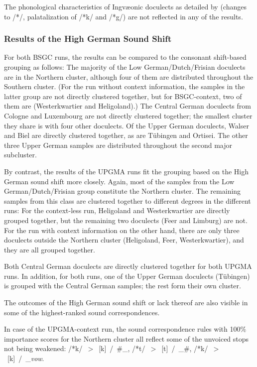 \documentclass[a4paper]{article}
\begin{document}
The phonological characteristics of Ingv\ae{}onic doculects
as detailed by \citet{stiles2013pan-west}
(changes to /*\textscripta{}/, palatalization of /*k/ and /*g/)
are not reflected in any of the results.

\subsubsection{Results of the High German Sound Shift}

For both BSGC runs, the results can be compared to the consonant shift-based grouping as follows:
The majority of the Low German/Dutch/Frisian doculects are in
the Northern cluster,
although four of them are distributed throughout the Southern cluster.
(For the run without context information,
the samples in the latter group are not directly clustered together,
but for BSGC-context,
two of them are (Westerkwartier and Heligoland).)
The Central German doculects from Cologne and Luxembourg
are not directly clustered together; the smallest cluster they share
is with four other doculects.
Of the Upper German doculects,
Walser and Biel are directly clustered together,
as are T\"{u}bingen and Ortisei.
The other three Upper German samples are distributed throughout
the second major subcluster.

By contrast, the results of the UPGMA runs fit
the grouping based on the High German sound shift more closely.
Again, most of the samples from the Low German/Dutch/Frisian group
constitute the Northern cluster.
The remaining samples from this class are clustered together
to different degrees in the different runs:
For the context-less run,
Heligoland and Westerkwartier are directly grouped together,
but the remaining two doculects (Feer and Limburg) are not.
For the run with context information on the other hand,
there are only three doculects outside the Northern cluster
(Heligoland, Feer, Westerkwartier),
and they are all grouped together.

Both Central German doculects are directly clustered together
for both UPGMA runs. In addition, for both runs, one of the
Upper German doculects (T\"{u}bingen) is grouped with the
Central German samples; the rest form their own cluster.

The outcomes of the High German sound shift or lack thereof
are also visible in some of the highest-ranked sound correspondences.

In case of the UPGMA-context run,
the sound correspondence rules with 100\% importance scores
for the Northern cluster
all reflect some of the unvoiced stops not being weakened:
/*k/~$>$~[k]~/~\#\_, /*t/~$>$~[t]~/~\_\#, /*k/~$>$~[k]~/~\_\textit{vow}.
\end{document}
